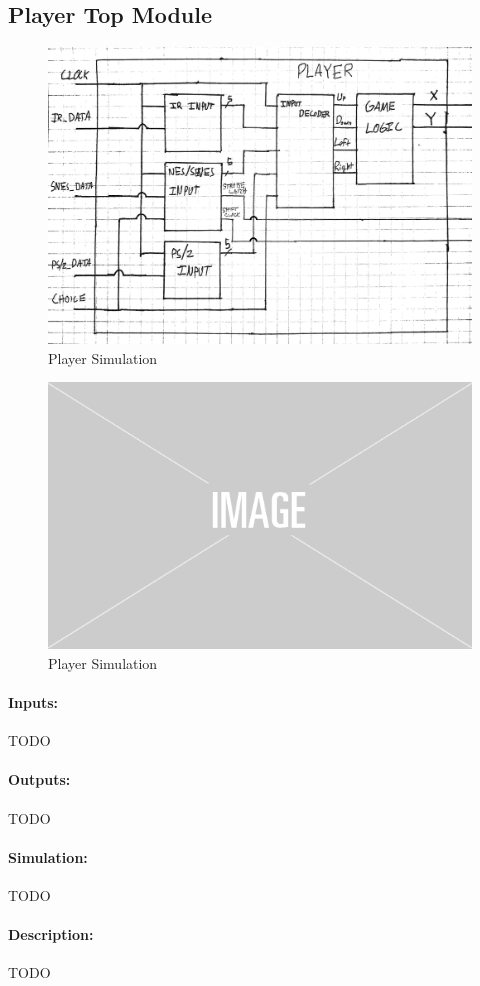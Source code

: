 \documentclass[]{article}
\begin{document}
\subsection{Player Top Module}
\begin{figure}[H]\centering
    \includegraphics[width=\linewidth]{figures/Player_Block.jpg}
    \caption{Player Simulation}
    \label{fig:irParserBlock}
\end{figure}
\begin{figure}[H]\centering
    \includegraphics[width=0.5\linewidth]{figures/placeholder.png}
    \caption{Player Simulation}
    \label{fig:irParserSim}
\end{figure}
\paragraph{Inputs:} TODO
\paragraph{Outputs:} TODO
\paragraph{Simulation:} TODO
\paragraph{Description:} TODO
\end{document}
